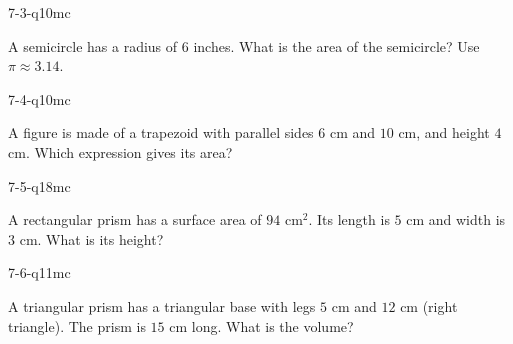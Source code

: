 \begin{practiceQuestion}{7-3-q10}{mc}
\begin{questionText}
A semicircle has a radius of $6$ inches. What is the area of the semicircle? Use $\pi \approx 3.14$.
\end{questionText}
\end{practiceQuestion}

\begin{practiceQuestion}{7-4-q10}{mc}
\begin{questionText}
A figure is made of a trapezoid with parallel sides $6$ cm and $10$ cm, and height $4$ cm. Which expression gives its area?
\end{questionText}
\end{practiceQuestion}

\begin{practiceQuestion}{7-5-q18}{mc}
\begin{questionText}
A rectangular prism has a surface area of $94$ cm$^2$. Its length is $5$ cm and width is $3$ cm. What is its height?
\end{questionText}
\end{practiceQuestion}

\begin{practiceQuestion}{7-6-q11}{mc}
\begin{questionText}
A triangular prism has a triangular base with legs $5$ cm and $12$ cm (right triangle). The prism is $15$ cm long. What is the volume?
\end{questionText}
\end{practiceQuestion}

